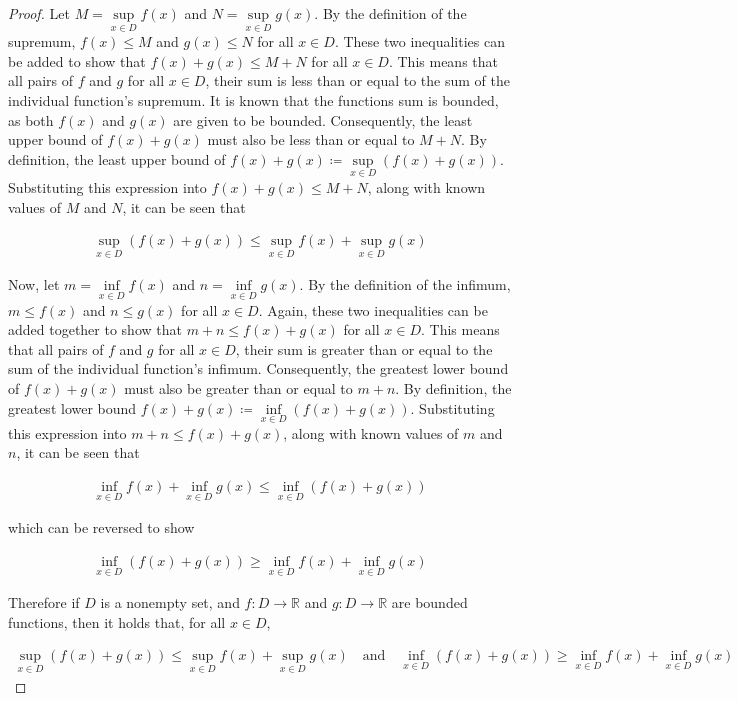 \documentclass[12pt]{article}
\newcommand{\bR}{{\mathbb{R}}}
\begin{document}
\begin{proof}
	Let $M=\underset{x\in D}{\sup}f(x)$ and $N=\underset{x\in D}{\sup}g(x)$. By the definition of the supremum, $f(x)\le M$ and $g(x)\le N$ for all $x\in D$. These two inequalities can be added to show that $f(x)+g(x)\le M + N$ for all $x\in D$. This means that all pairs of $f$ and $g$ for all $x\in D$, their sum is less than or equal to the sum of the individual function's supremum. It is known that the functions sum is bounded, as both $f(x)$ and $g(x)$ are given to be bounded. Consequently, the least upper bound of $f(x)+g(x)$ must also be less than or equal to $M+N$. By definition, the least upper bound of $f(x)+g(x) \coloneq \underset{x\in D}{\sup}(f(x) + g(x))$. Substituting this expression into $f(x)+g(x)\le M + N$, along with known values of $M$ and $N$, it can be seen that
	
\begin{align*}
	\underset{x\in D}{\sup}(f(x) + g(x))\le\underset{x\in D}{\sup}f(x) + \underset{x\in D}{\sup}g(x)
\end{align*}

Now, let $m=\underset{x\in D}{\inf}f(x)$ and $n=\underset{x\in D}{\inf}g(x)$. By the definition of the infimum, $m\le f(x)$ and $n\le g(x)$ for all $x\in D$. Again, these two inequalities can be added together to show that $m+n\le f(x)+g(x)$ for all $x\in D$. This means that all pairs of $f$ and $g$ for all $x\in D$, their sum is greater than or equal to the sum of the individual function's infimum. Consequently, the greatest lower bound of $f(x)+g(x)$ must also be greater than or equal to $m+n$. By definition, the greatest lower bound $f(x)+g(x)\coloneq\underset{x\in D}{\inf}(f(x)+g(x))$. Substituting this expression into  $m+n\le f(x)+g(x)$, along with known values of $m$ and $n$, it can be seen that

\begin{align*}
	\underset{x\in D}{\inf}f(x) + \underset{x\in D}{\inf}g(x)\le \underset{x\in D}{\inf}(f(x)+g(x))
\end{align*}

\noindent which can be reversed to show

\begin{align*}
	\underset{x\in D}{\inf}(f(x)+g(x))\ge \underset{x\in D}{\inf}f(x) + \underset{x\in D}{\inf}g(x)
\end{align*}

Therefore if $D$ is a nonempty set, and $f : D\to\bR$ and $g : D\to \bR$ are bounded functions, then it holds that, for all $x\in D$,

\begin{align*}
	\underset{x\in D}{\sup}(f(x) + g(x))\le\underset{x\in D}{\sup}f(x) + \underset{x\in D}{\sup}g(x) \quad \text{and} \quad \underset{x\in D}{\inf}(f(x)+g(x))\ge \underset{x\in D}{\inf}f(x) + \underset{x\in D}{\inf}g(x)
\end{align*}

\end{proof}
\end{document}
